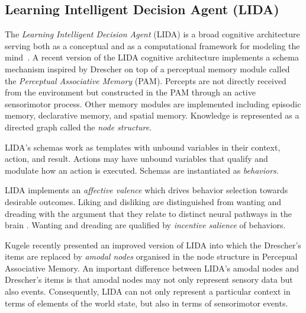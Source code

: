 \documentclass[runningheads]{llncs}
\begin{document}
\subsection{Learning Intelligent Decision Agent (LIDA)}
\label{sec:lida}

The \textit{Learning Intelligent Decision Agent} (LIDA) is a broad cognitive architecture serving both as a conceptual and as a computational framework for modeling the mind~\cite{franklin_foundational_2007,franklin_2013_lida}.
A recent version of the LIDA cognitive architecture \cite{kugele_learning_2021} implements a schema mechanism inspired by Drescher on top of a perceptual memory module called the \textit{Perceptual Associative Memory} (PAM). 
Percepts are not directly received from the environment but constructed in the PAM through an active sensorimotor process. 
Other memory modules are implemented including episodic memory, declarative memory, and spatial memory.
Knowledge is represented as a directed graph called the \textit{node structure}. 

LIDA's schemas work as templates with unbound variables in their context, action, and result. 
Actions may have unbound variables that qualify and modulate how an action is executed. 
Schemas are instantiated as \textit{behaviors}. 

LIDA implements an \textit{affective valence} 
which drives 
behavior selection towards desirable outcomes. 
Liking and disliking are distinguished from wanting and dreading with the argument that they relate to distinct neural pathways in the brain \cite{kringelbach_functional_2010}. 
Wanting and dreading are qualified by \textit{incentive salience} of behaviors.   

Kugele \cite{kugele_constructivist_2025} recently presented an improved version of LIDA into which the
Drescher's items are replaced by \textit{amodal nodes} organised in the node structure in Percepual Associative Memory. 
An important difference between LIDA's amodal nodes and Drescher's items is that amodal nodes may not only represent sensory data but also events. 
Consequently, LIDA can not only represent a particular context in terms of elements of the world state, but also in terms of sensorimotor events. 
\end{document}
